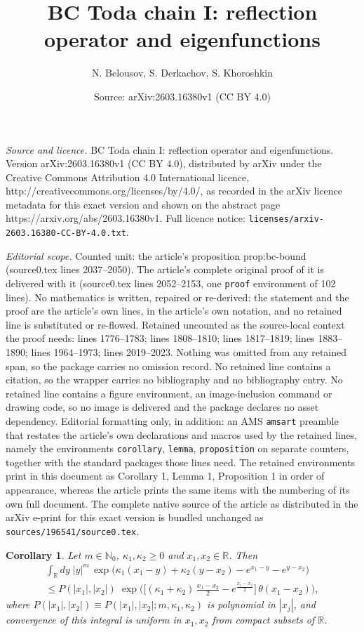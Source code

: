 \documentclass[10pt,a4paper]{amsart}
\title{BC Toda chain I: reflection operator and eigenfunctions}
\author{N. Belousov, S. Derkachov, S. Khoroshkin}
\date{Source: arXiv:2603.16380v1 (CC BY 4.0)}
\newtheorem{corollary}{Corollary}
\begin{document}
\maketitle

\noindent\emph{Source and licence.} BC Toda chain I: reflection operator and eigenfunctions. Version arXiv:2603.16380v1 (CC BY 4.0), distributed by arXiv under the Creative Commons Attribution 4.0 International licence, http://creativecommons.org/licenses/by/4.0/, as recorded in the arXiv licence metadata for this exact version and shown on the abstract page https://arxiv.org/abs/2603.16380v1. Full licence notice: \texttt{licenses/arxiv-2603.16380-CC-BY-4.0.txt}.\par\smallskip

\noindent\textit{Editorial scope.} Counted unit: the article's proposition prop:bc-bound (source0.tex lines 2037--2050). The article's complete original proof of it is delivered with it (source0.tex lines 2052--2153, one \texttt{proof} environment of 102 lines). No mathematics is written, repaired or re-derived: the statement and the proof are the article's own lines, in the article's own notation, and no retained line is substituted or re-flowed.  Retained uncounted as the source-local context the proof needs: lines 1776--1783; lines 1808--1810; lines 1817--1819; lines 1883--1890; lines 1964--1973; lines 2019--2023.  Nothing was omitted from any retained span, so the package carries no omission record.  No retained line contains a citation, so the wrapper carries no bibliography and no bibliography entry.  No retained line contains a figure environment, an image-inclusion command or drawing code, so no image is delivered and the package declares no asset dependency.  Editorial formatting only, in addition: an AMS \texttt{amsart} preamble that restates the article's own declarations and macros used by the retained lines, namely the environments \texttt{corollary}, \texttt{lemma}, \texttt{proposition} on separate counters, together with the standard packages those lines need.  The retained environments print in this document as Corollary 1, Lemma 1, Proposition 1 in order of appearance, whereas the article prints the same items with the numbering of its own full document.  The complete native source of the article as distributed in the arXiv e-print for this exact version is bundled unchanged as \texttt{sources/196541/source0.tex}.
\begin{corollary} \label{corlem2}
	Let $m \in \mathbb{N}_0$, $\kappa_1, \kappa_2 \geq 0$ and $x_1, x_2 \in \mathbb{R}$. Then
	\begin{multline}
		\int_{\mathbb{R}} dy\; |y|^m \, \exp\bigl(\kappa_1 (x_1 - y) + \kappa_2 (y - x_2) - e^{x_1 - y} - e^{y - x_2} \bigr) \\
		\leq P(|x_1|, |x_2|) \; \exp \biggl( \biggl[ (\kappa_1 + \kappa_2) \, \frac{x_1 - x_2}{2} -e^{ \frac{x_1 - x_2}{2} } \biggr] \, \theta(x_1 - x_2) \biggr),
	\end{multline}
	where $P(|x_1|, |x_2|) \equiv P(|x_1|, |x_2|; m, \kappa_1, \kappa_2)$ is polynomial in $|x_j|$, and convergence of this integral is uniform in $x_1, x_2$ from compact subsets of $\mathbb{R}$.
\end{corollary}
\end{document}
